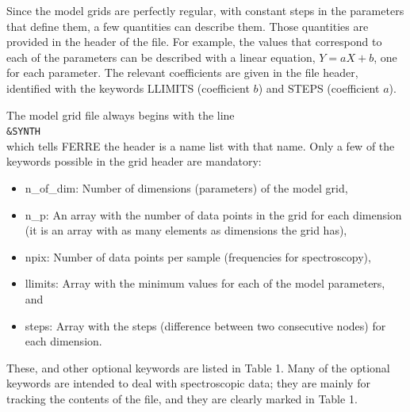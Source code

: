 \documentclass[12pt]{article}
\begin{document}
Since the model grids are perfectly regular, with constant steps in the parameters
that define them, a few quantities can describe them. Those quantities
are provided in the header of the file. For example, the values that
correspond to each of the parameters can be described with a linear
equation, $Y=aX+b$, one for each parameter.  The relevant coefficients  
are given  in the file header, identified with the keywords 
LLIMITS (coefficient $b$) and STEPS (coefficient $a$). 

The model grid file always begins with the line \\
{\tt \&SYNTH}\\
which tells FERRE the header is a name list with that name.
Only a few of the keywords possible in the grid header are mandatory: 
\begin{itemize}
\item n\_of\_dim: Number of dimensions (parameters) of the model grid,
\item n\_p: An array with the number of data points in the grid for each 
dimension (it is an array with as many elements as dimensions the grid has),
\item npix: Number of data points per sample (frequencies for
	spectroscopy),
\item llimits: Array with the minimum values for each of the model parameters, and 
\item steps: Array with the steps (difference between two consecutive nodes) 
for each dimension.
\end{itemize}

These, and other optional keywords
are listed in Table 1. Many of the optional keywords are
intended to deal with spectroscopic data; they are mainly 
for tracking the contents of the file, and they are clearly
marked in Table 1.
\end{document}
